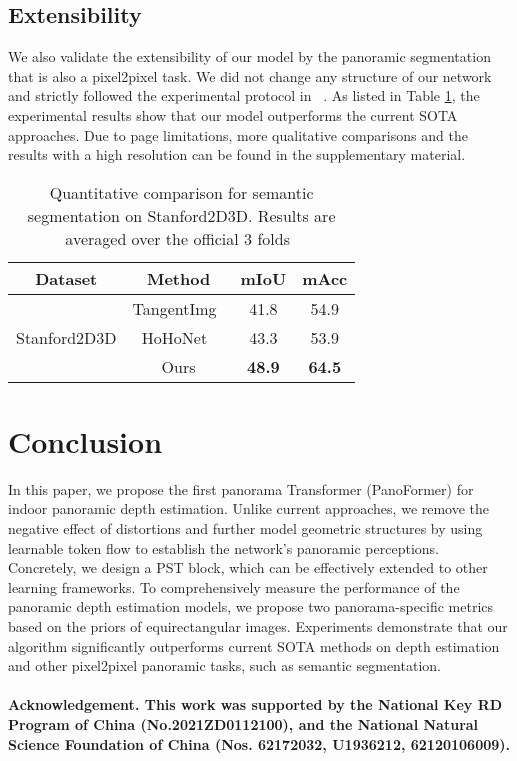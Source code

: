 \documentclass[runningheads]{llncs}
\begin{document}
\subsection{Extensibility}
 We also validate the extensibility of our model by the panoramic segmentation that is also a pixel2pixel task. We did not change any structure of our network and strictly followed the experimental protocol in ~\cite{sun2021hohonet}. As listed in Table \ref{tab:seg}, the experimental results show that our model outperforms the current SOTA approaches. Due to page limitations, more qualitative comparisons and the results with a high resolution can be found in the supplementary material.
 \begin{table}[ht]
\begin{center}
\caption{Quantitative comparison for semantic segmentation on Stanford2D3D. Results are averaged over the official 3 folds~\cite{sun2021hohonet}}
\label{tab:seg}
\begin{tabular}{c|c|c|c}
  \hline
  Dataset & Method &mIoU&mAcc
  \\
  \hline
   & TangentImg~\cite{eder2020tangent}&41.8&54.9\\
   \cline{2-4}
  Stanford2D3D& HoHoNet~\cite{sun2021hohonet}&43.3&53.9\\
   \cline{2-4}
    &Ours&\textbf{48.9}&\textbf{64.5}\\
  \hline
\end{tabular}
\end{center}
\vspace{-2.5em}
\end{table}
\section{Conclusion}
\label{section6}
In this paper, we propose the first panorama Transformer (PanoFormer) for indoor panoramic depth estimation. Unlike current approaches, we remove the negative effect of distortions and further model geometric structures by using learnable token flow to establish the network's panoramic perceptions. Concretely, we design a PST block, which can be effectively extended to other learning frameworks. To comprehensively measure the performance of the panoramic depth estimation models, we propose two panorama-specific metrics based on the priors of equirectangular images. Experiments demonstrate that our algorithm significantly outperforms current SOTA methods on depth estimation and other pixel2pixel panoramic tasks, such as semantic segmentation.

\paragraph{\textbf{Acknowledgement}. This work was supported by the National Key RD Program of China (No.2021ZD0112100), and the National Natural Science Foundation of China (Nos. 62172032, U1936212, 62120106009).}


\end{document}
